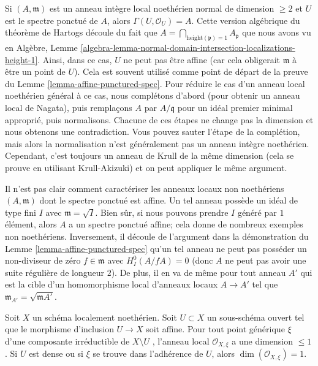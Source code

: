 \begin{remark}
\label{remark-affine-punctured-spectrum-standard-proof}
Si  $(A, \mathfrak m)$  est un anneau intègre local noethérien normal de dimension  $\geq 2$ 
et  $U$  est le spectre ponctué de  $A$, alors  $\Gamma(U, \mathcal{O}_U) = A$. Cette
version algébrique du théorème de Hartogs découle du fait que  $A = \bigcap_{\text{height}(\mathfrak p) = 1} A_\mathfrak p$  que
nous avons vu en Algèbre, Lemme  \ref{algebra-lemma-normal-domain-intersection-localizations-height-1}. Ainsi, dans ce cas,  $U$  ne
peut pas être affine (car cela obligerait  $\mathfrak m$  à être un point de
 $U$). Cela est souvent utilisé comme point de départ de la preuve du
Lemme  \ref{lemma-affine-punctured-spec}. Pour réduire le cas d'un anneau local noethérien général à ce
cas, nous complétons d'abord (pour obtenir un anneau local de Nagata), puis
remplaçons  $A$  par  $A/\mathfrak q$  pour un idéal premier minimal approprié,
puis normalisons. Chacune de ces étapes ne change pas la dimension et nous
obtenons une contradiction. Vous pouvez sauter l'étape de la complétion, mais
alors la normalisation n'est généralement pas un anneau intègre noethérien. Cependant,
c'est toujours un anneau de Krull de la même dimension (cela se prouve en
utilisant Krull-Akizuki) et on peut appliquer le même argument.
\end{remark}

\begin{remark}
\label{remark-affine-puctured-spectrum-general}
Il n'est pas clair comment caractériser les anneaux locaux non noethériens
 $(A, \mathfrak m)$  dont le spectre ponctué est affine. Un tel anneau possède un idéal
de type fini  $I$  avec  $\mathfrak m = \sqrt{I}$. Bien sûr, si nous pouvons prendre
 $I$  généré par  $1$  élément, alors  $A$  a un spectre
ponctué affine; cela donne de nombreux exemples non noethériens. Inversement, il
découle de l'argument dans la démonstration du Lemme  \ref{lemma-affine-punctured-spec}  qu'un tel anneau
ne peut pas posséder un non-diviseur de zéro  $f \in \mathfrak m$  avec  $H^0_I(A/fA) = 0$  (donc
 $A$  ne peut pas avoir une suite régulière de longueur  $2$). De
plus, il en va de même pour tout anneau  $A'$  qui est la cible d'un
homomorphisme local d'anneaux locaux  $A \to A'$  tel que  $\mathfrak m_{A'} = \sqrt{\mathfrak mA'}$.
\end{remark}

\begin{lemma}
\label{lemma-complement-affine-open-immersion}
\begin{reference}
\cite[EGA IV, Corollaire 21.12.7]{EGA4}
\end{reference}
Soit  $X$  un schéma localement noethérien. Soit  $U \subset X$  un
sous-schéma ouvert tel que le morphisme d'inclusion  $U \to X$  soit affine. Pour
tout point générique  $\xi$  d'une composante irréductible de  $X \setminus U$ ,
l'anneau local  $\mathcal{O}_{X, \xi}$  a une dimension  $\leq 1$. Si  $U$  est
dense ou si  $\xi$  se trouve dans l'adhérence de  $U$, alors
 $\dim(\mathcal{O}_{X, \xi}) = 1$.
\end{lemma}


